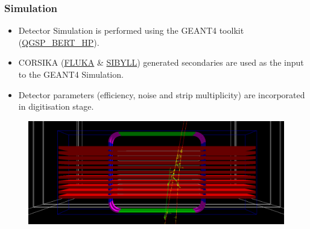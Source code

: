 \documentclass{beamer}
\begin{document}
\begin{frame}
  \frametitle{Simulation}
  \vspace*{-6pt}
  \begin{itemize} %
  \item Detector Simulation is performed using the GEANT4 toolkit
    (\url{QGSP_BERT_HP}).
  \item CORSIKA (\url{FLUKA} \& \url{SIBYLL}) generated secondaries
    are used as the input to the GEANT4 Simulation.
  \item Detector parameters (efficiency, noise and strip
    multiplicity) are incorporated in digitisation stage.
  \end{itemize}
  \vspace*{-5pt}
  \begin{figure}[h!]
    \includegraphics[width=0.99\linewidth]{mical_view.png}
  \end{figure}
  \vspace*{-9pt}
\end{frame}
\end{document}
